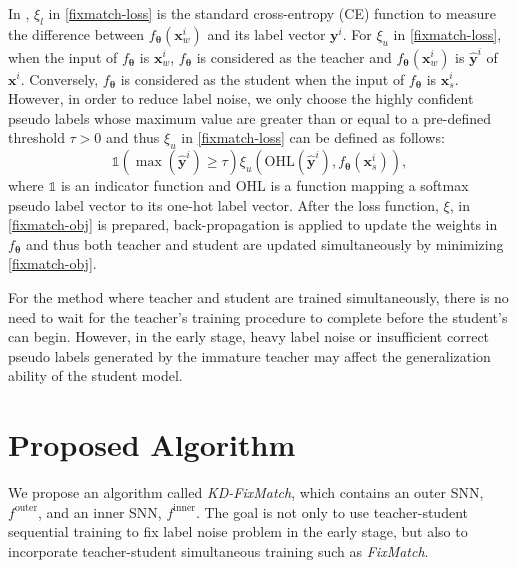 \documentclass{article}
\def\bx{{\boldsymbol x}}
\def\by{{\boldsymbol y}}
\def\btheta{\boldsymbol \theta}
\begin{document}
\par In \cite{KS20a}, $\xi_l$ in \eqref{fixmatch-loss} is the standard cross-entropy (CE) function to measure the difference between $f_{\btheta}(\bx^i_{w})$ and its label vector $\by^i$.
For $\xi_u$ in \eqref{fixmatch-loss},
when the input of $f_{\btheta}$ is $\bx^i_w$, $f_{\btheta}$ is considered as the teacher and
$f_{\btheta}(\bx^i_{w})$ is $\hat{\by}^i$ of $\bx^i$.
Conversely, $f_{\btheta}$ is considered as the student when the input of $f_{\btheta}$ is $\bx^i_s$.
However, in order to reduce label noise, we only choose the highly confident pseudo labels whose maximum value are greater than or equal to a pre-defined threshold $\tau > 0$
and thus $\xi_u$ in \eqref{fixmatch-loss} can be defined as follows:
\begin{equation}
\label{fixmatch-filter}
    \mathbb{1}(\max(\hat{\by}^i) \geq \tau )
      \xi_{u}(\text{OHL}(\hat{\by}^i), f_{\btheta}(\bx^i_{s})),
\end{equation}
where $\mathbb{1}$ is an indicator function and OHL is a function mapping a softmax pseudo label vector to its one-hot label vector.
After the loss function, $\xi$, in \eqref{fixmatch-obj} is prepared, back-propagation is applied to update the weights in $f_{\btheta}$ and thus
both teacher and student are updated simultaneously by minimizing \eqref{fixmatch-obj}.

For the method where teacher and student are trained simultaneously, there is no need to wait for the teacher's training procedure to complete before the student's can begin.
However, in the early stage, heavy label noise or insufficient correct pseudo labels
generated by the immature teacher may affect the generalization ability of the student model.

\section{Proposed Algorithm}
\label{sec:proposed-alg}

We propose an algorithm called {\sl KD-FixMatch}, which contains an outer SNN, $f^{\text{outer}}$, and an inner SNN, $f^{\text{inner}}$.
The goal is not only to use teacher-student sequential training to fix label noise problem in the early stage,
but also to incorporate teacher-student simultaneous training such as {\sl FixMatch}.
\end{document}
